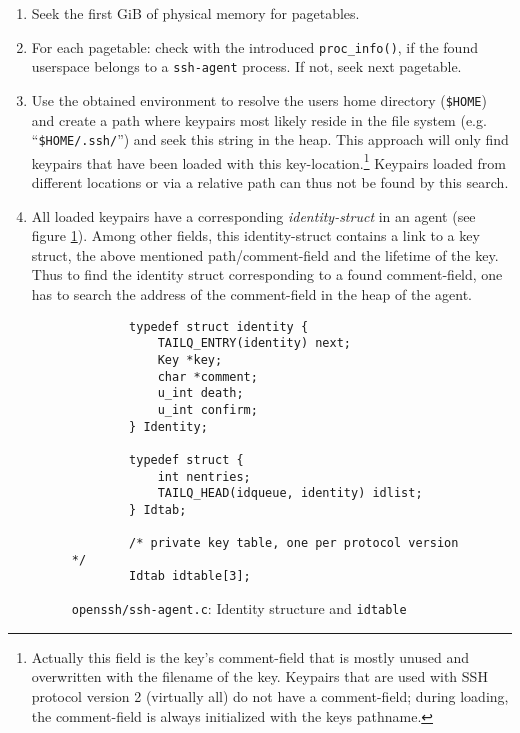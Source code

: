 \begin{enumerate}

	\item Seek the first GiB of physical memory for pagetables.

	\item For each pagetable: check with the introduced
		\texttt{proc\_info()}, if the found userspace belongs to a
		\texttt{ssh-agent} process. If not, seek next pagetable.

	\item Use the obtained environment to resolve the users home directory
		(\texttt{\$HOME}) and create a path where keypairs most likely
		reside in the file system (e.g.  ``\texttt{\$HOME/.ssh/}'') and
		seek this string in the heap.  This approach will only find
		keypairs that have been loaded with this
		key-location.\footnote{Actually this field is the key's
		comment-field that is mostly unused and overwritten with the
		filename of the key. Keypairs that are used with SSH protocol
		version 2 (virtually all) do not have a comment-field; during
		loading, the comment-field is always initialized with the keys
		pathname.} Keypairs loaded from different locations or via a
		relative path can thus not be found by this search.
	
	\item All loaded keypairs have a corresponding \emph{identity-struct} in
		an agent (see figure \ref{fig:code:identity-struct}). Among
		other fields, this identity-struct contains a link to a key
		struct, the above mentioned path/comment-field and the lifetime
		of the key. Thus to find the identity struct corresponding to a
		found comment-field, one has to search the address of the
		comment-field in the heap of the agent.

\lstset{language=C, numbers=left, numberstyle=\tiny, frame=lines}
\begin{figure}[h] \begin{center}
	\tiny
	\begin{lstlisting}
		typedef struct identity {
			TAILQ_ENTRY(identity) next;
			Key *key;
			char *comment;
			u_int death;
			u_int confirm;
		} Identity;

		typedef struct {
			int nentries;
			TAILQ_HEAD(idqueue, identity) idlist;
		} Idtab;

		/* private key table, one per protocol version */
		Idtab idtable[3];
	\end{lstlisting}
	\caption{\texttt{openssh/ssh-agent.c}: Identity structure and \texttt{idtable}}
	\label{fig:code:identity-struct}
\end{center}\end{figure}
	

\end{enumerate}
